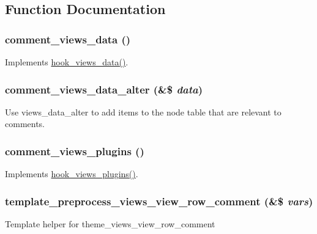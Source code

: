 \subsection{Function Documentation}
\hypertarget{comment_8views_8inc_a36dff975ac53893da10163d2ee59d652}{
\subsubsection[{comment\_\-views\_\-data}]{\setlength{\rightskip}{0pt plus 5cm}comment\_\-views\_\-data ()}}
\label{comment_8views_8inc_a36dff975ac53893da10163d2ee59d652}
Implements \hyperlink{group__views__hooks_ga227057901681e4a33e33c199c7a8c989}{hook\_\-views\_\-data()}. \hypertarget{comment_8views_8inc_af68bf474455d07d3fc30c9f61b830f30}{
\subsubsection[{comment\_\-views\_\-data\_\-alter}]{\setlength{\rightskip}{0pt plus 5cm}comment\_\-views\_\-data\_\-alter (\&\$ {\em data})}}
\label{comment_8views_8inc_af68bf474455d07d3fc30c9f61b830f30}
Use views\_\-data\_\-alter to add items to the node table that are relevant to comments. \hypertarget{comment_8views_8inc_a20b0377d6793f1f1e1b70bcae9dd067b}{
\subsubsection[{comment\_\-views\_\-plugins}]{\setlength{\rightskip}{0pt plus 5cm}comment\_\-views\_\-plugins ()}}
\label{comment_8views_8inc_a20b0377d6793f1f1e1b70bcae9dd067b}
Implements \hyperlink{group__views__hooks_ga23f6e9972b2ed84fc54b7ff63f44477d}{hook\_\-views\_\-plugins()}. \hypertarget{comment_8views_8inc_ac5f17442ee6b1364544217dc2515f0ef}{
\subsubsection[{template\_\-preprocess\_\-views\_\-view\_\-row\_\-comment}]{\setlength{\rightskip}{0pt plus 5cm}template\_\-preprocess\_\-views\_\-view\_\-row\_\-comment (\&\$ {\em vars})}}
\label{comment_8views_8inc_ac5f17442ee6b1364544217dc2515f0ef}
Template helper for theme\_\-views\_\-view\_\-row\_\-comment 